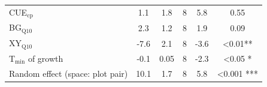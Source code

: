 \documentclass[
  letterpaper,
  DIV=11,
  numbers=noendperiod]{scrartcl}
\begin{document}
\begin{table}[H]
\begin{tabular}[t]{lccccc}
\midrule
\hspace{1em}\hspace{1em}CUE$_{\mathrm{cp}}$ & 1.1 & 1.8 & 8 & 5.8 & 0.55\\
\hspace{1em}\hspace{1em}BG$_{\mathrm{Q10}}$ & 2.3 & 1.2 & 8 & 1.9 & 0.09\\
\hspace{1em}\hspace{1em}XY$_{\mathrm{Q10}}$ & -7.6 & 2.1 & 8 & -3.6 & <0.01**\\
\hspace{1em}\hspace{1em}T$_{\mathrm{min}}$ of growth & -0.1 & 0.05 & 8 & -2.3 & <0.05 *\\
\midrule
\hspace{1em}Random effect (space: plot pair) & 10.1 & 1.7 & 8 & 5.8 & <0.001 ***\\
\midrule

\end{tabular}
\end{table}
\end{document}
